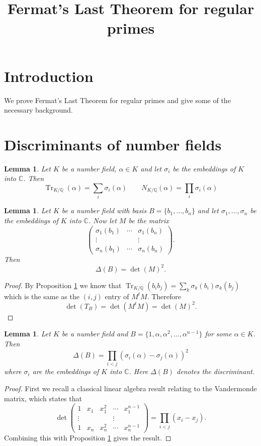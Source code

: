 \documentclass[11pt,a4paper]{amsart}
\title{Fermat's Last Theorem for regular primes}
\theoremstyle{plain}
\newtheorem{lem}[subsection]{Lemma}
\theoremstyle{definition}
\theoremstyle{definition}
\newcommand{\Tr}{\operatorname{Tr}}
\def\CC{\mathbb{C}}
\def\QQ{\mathbb{Q}}
\def \a{\alpha}
\begin{document}
	\maketitle
	\tableofcontents
	\section{Introduction}
	We prove Fermat's Last Theorem for regular primes and give some of the necessary background. 	
	
	\section{Discriminants of number fields}	
	\begin{lem}\label{lem: alt defn of norm and trace}
		Let $K$ be a number field, $\a \in K$ and let $\sigma_i$ be the embeddings of $K$ into $\CC$. Then \[\Tr_{K/\QQ}(\a) =\sum_i \sigma_i(\a) \qquad N_{K/\QQ}(\a)=\prod_i \sigma_i(\a)  \]
	\end{lem}
	
	\begin{lem}\label{lem: disc via embs}
		Let $K$ be a number field with basis $B=\{b_1,\dots,b_n\}$ and let $\sigma_1,\dots,\sigma_n$ be the embeddings of $K$ into $\CC$. Now let $M$ be the matrix  \[\left (\begin{matrix} \sigma_1(b_1) &\cdots& \sigma_1(b_n)\\ \vdots & & \vdots \\  \sigma_n(b_1) &\cdots& \sigma_n(b_n)
		\end{matrix} \right ).\] Then \[\Delta(B)=\det(M)^2.\]
	\end{lem}
	
	
	\begin{proof}
		By Proposition \ref{lem: alt defn of norm and trace} we know that  $\Tr_{K/\QQ}(b_i b_j)= \sum_k \sigma_k(b_i)\sigma_k(b_j)$ which is the same as the $(i,j)$ entry of $M^t M$. Therefore \[\det(T_B)=\det(M^t M)=\det(M)^2.\]
	\end{proof}
	
	\begin{lem}\label{lem: disc of prim elt basis}
		Let $K$ be a number field and $B=\{1,\a,\a^2,\dots,\a^{n-1}\}$ for some $\a \in K$. Then \[\Delta(B)=\prod_{i < j} (\sigma_i(\a)-\sigma_j(\a))^2\] where $\sigma_i$ are the embeddings of $K $ into $\CC$. Here $\Delta(B)$ denotes the discriminant.
	\end{lem}
	\begin{proof}
		First we recall a classical linear algebra result relating to the Vandermonde matrix, which states that  \[\det \left (\begin{matrix} 1 & x_1& x_1^2&\cdots&x_1^{n-1} \\ \vdots & & & \vdots \\   1 & x_n& x_n^2&\cdots&x_n^{n-1}
		\end{matrix} \right ) =\prod_{i<j} (x_i-x_j).\] Combining this with Proposition \ref{lem: disc via embs} gives the result.
	\end{proof}
	
\end{document}
